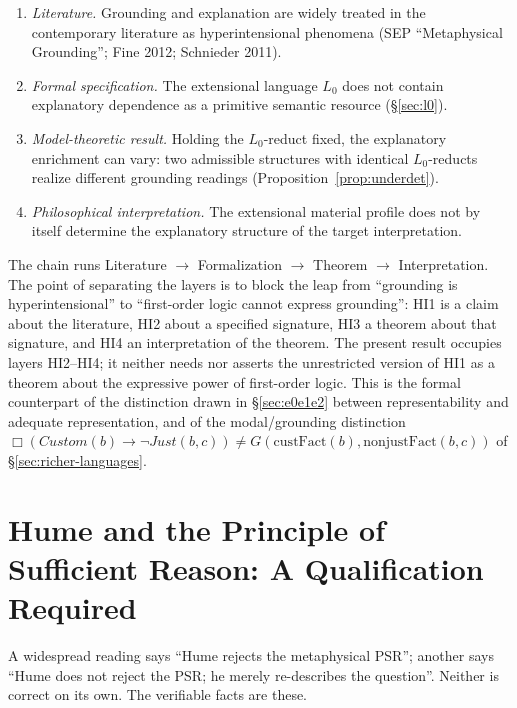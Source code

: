 \documentclass[11pt]{article}
\theoremstyle{plain}
\theoremstyle{definition}
\theoremstyle{remark}
\begin{document}
\begin{enumerate}
\item[HI1.] \emph{Literature.} Grounding and explanation are widely
treated in the contemporary literature as hyperintensional phenomena
(SEP ``Metaphysical Grounding''; Fine 2012; Schnieder 2011).
\item[HI2.] \emph{Formal specification.} The extensional language
$L_0$ does not contain explanatory dependence as a primitive semantic
resource (\S\ref{sec:l0}).
\item[HI3.] \emph{Model-theoretic result.} Holding the $L_0$-reduct
fixed, the explanatory enrichment can vary: two admissible structures
with identical $L_0$-reducts realize different grounding readings
(Proposition~\ref{prop:underdet}).
\item[HI4.] \emph{Philosophical interpretation.} The extensional
material profile does not by itself determine the explanatory
structure of the target interpretation.
\end{enumerate}

The chain runs Literature $\to$ Formalization $\to$ Theorem $\to$
Interpretation. The point of separating the layers is to block the
leap from ``grounding is hyperintensional'' to ``first-order logic
cannot express grounding'': HI1 is a claim about the literature, HI2
about a specified signature, HI3 a theorem about that signature, and
HI4 an interpretation of the theorem. The present result occupies
layers HI2--HI4; it neither needs nor asserts the unrestricted version
of HI1 as a theorem about the expressive power of first-order logic.
This is the formal counterpart of the distinction drawn in
\S\ref{sec:e0e1e2} between representability and adequate
representation, and of the modal/grounding distinction
$\Box(Custom(b) \to \neg Just(b,c)) \neq
G(\mathrm{custFact}(b), \mathrm{nonjustFact}(b,c))$ of
\S\ref{sec:richer-languages}.

\section{Hume and the Principle of Sufficient Reason: A Qualification
Required}
\label{sec:hume-psr}

A widespread reading says ``Hume rejects the metaphysical PSR'';
another says ``Hume does not reject the PSR; he merely re-describes the
question''. Neither is correct on its own. The verifiable facts are
these.
\end{document}
